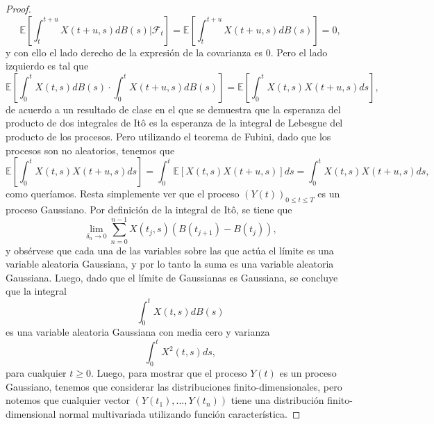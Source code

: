 \documentclass[letterpaper]{article}
\newcommand{\F}{\mathcal{F}}
\renewcommand{\to}{\rightarrow}
\newcommand{\E}{\mathbb{E}}
\newcommand{\1}{\mathds{1}}
\theoremstyle{definition}
\theoremstyle{definition}
\theoremstyle{definition}
\theoremstyle{definition}
\theoremstyle{definition}
\begin{document}
\begin{enumerate}
\begin{proof}
       \[
        \E\left[\int_{t}^{t+u}X(t+u,s)dB(s)\Big|\F_t\right]=\E\left[\int_{t}^{t+u}X(t+u,s)dB(s)\right]=0,
       \]
       y con ello el lado derecho de la expresión de la covarianza es 0. Pero el lado izquierdo es tal que 
       \[
        \E\left[\int_{0}^{t}X(t,s)dB(s)\cdot\int_{0}^{t}X(t+u,s)dB(s)\right]=\E\left[\int_{0}^{t}X(t,s)X(t+u,s)ds\right],
       \]
       de acuerdo a un resultado de clase en el que se demuestra que la esperanza del
       producto de dos integrales de Itô es la esperanza de la integral de Lebesgue del
       producto de los procesos. Pero utilizando el teorema de Fubini, dado que los procesos 
       son no aleatorios, tenemos que 
       \[
        \E\left[\int_{0}^{t}X(t,s)X(t+u,s)ds\right]=\int_{0}^{t}\E\left[X(t,s)X(t+u,s)\right]ds=\int_{0}^{t}X(t,s)X(t+u,s)ds,
       \]
       como queríamos. Resta simplemente ver que el proceso $(Y(t))_{0\leq t \leq T}$ es un proceso
       Gaussiano. Por definición de la integral de Itô, se tiene que 
       \[
        \lim_{\delta_n\to0}\sum_{n=0}^{n-1}X(t_j,s)(B(t_{j+1})-B(t_j)),
       \]
       y obsérvese que cada una de las variables sobre las que actúa el límite 
       es una variable aleatoria Gaussiana, y por lo tanto la suma es una variable 
       aleatoria Gaussiana. Luego, dado que el límite de Gaussianas es Gaussiana, se concluye
       que la integral
       \[
        \int_{0}^{t}X(t,s)dB(s)
       \] 
       es una variable aleatoria Gaussiana con media cero y varianza 
       \[
        \int_{0}^{t}X^2(t,s)ds,
       \]
       para cualquier $t\geq0$. Luego, para mostrar que el proceso $Y(t)$ es un proceso
       Gaussiano, tenemos que considerar las distribuciones finito-dimensionales, pero notemos
       que cualquier vector $(Y(t_1),...,Y(t_n))$ tiene una distribución finito-dimensional
       normal multivariada utilizando función característica.
     \end{proof}


\end{enumerate}
\end{document}
